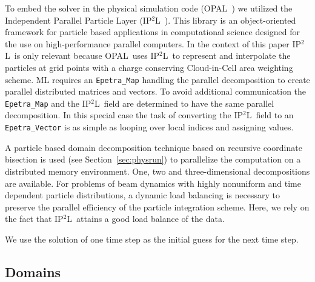 \documentclass[a4paper,10pt,3p,final,pdftex]{elsarticle}
\newcommand{\opal}{\textsc{OPAL}}
\newcommand{\ippl}{\textsc{IP$^2$L}}
\begin{document}
To embed the solver in the physical simulation code (\opal~\cite{opal})
we utilized the Independent Parallel Particle Layer (\ippl~\cite{ippl}).
This library is an object-oriented framework for particle based
applications in computational science designed for the use on
high-performance parallel computers.  In the context of this paper
\ippl\ is only relevant because \opal\ uses \ippl\ to represent and
interpolate the particles at grid points with a charge conserving
Cloud-in-Cell area weighting scheme.  ML requires an
\texttt{Epetra\_Map} handling the parallel decomposition to create
parallel distributed matrices and vectors. To avoid additional
communication the \texttt{Epetra\_Map} and the \ippl\ field are determined
to have the same parallel decomposition. In this special case the task
of converting the \ippl\ field to an \texttt{Epetra\_Vector} is as
simple as looping over local indices and assigning values.  

A particle based domain decomposition technique based on recursive coordinate
bisection is used (see Section~\ref{sec:physrun}) to parallelize the computation
on a distributed memory environment.  One, two and three-dimensional
decompositions are available.  For problems of beam dynamics with highly
nonuniform and time dependent particle distributions, a dynamic load balancing
is necessary to preserve the parallel efficiency of the particle integration
scheme.  Here, we rely on the fact that \ippl\ attains a good load balance of
the data.



We use the solution of one time step as the initial guess for the next
time step.


\subsection{Domains}
\end{document}
